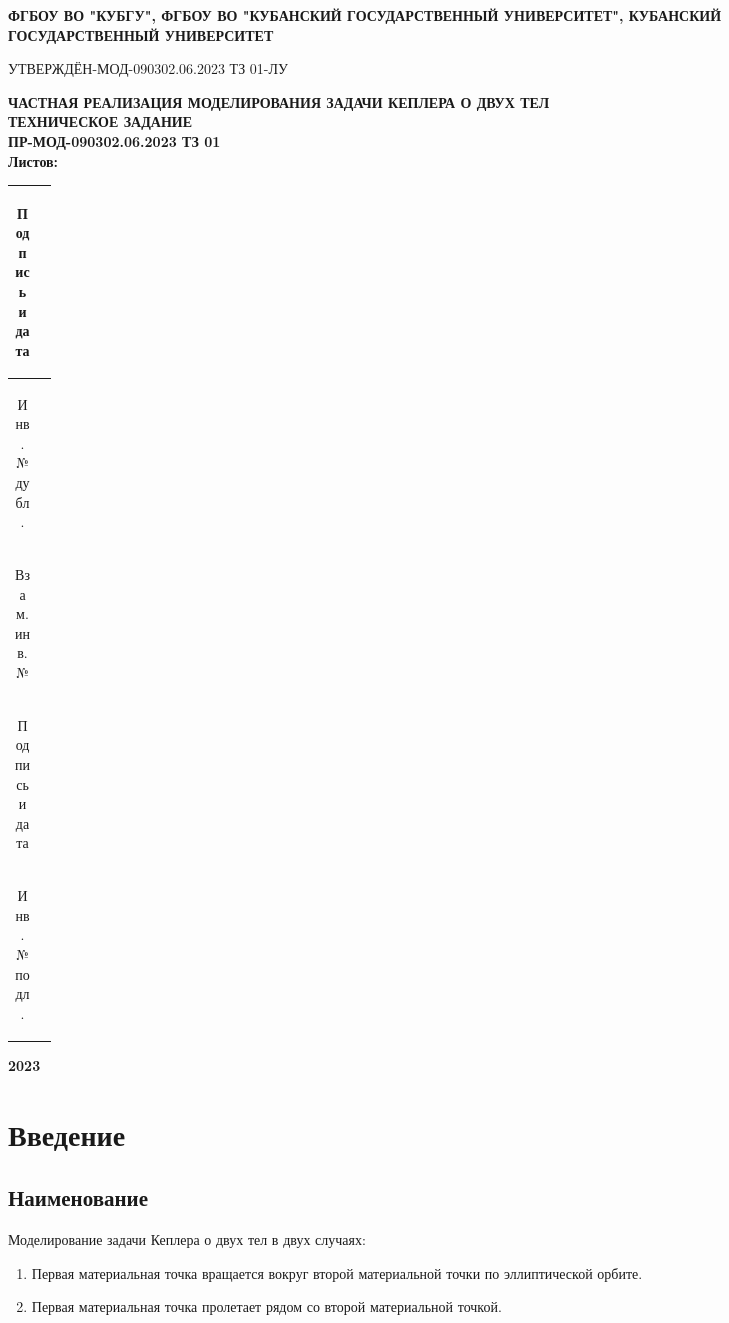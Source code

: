 


\thispagestyle{empty}
 \begin{center}
 \large{\textbf{ФГБОУ ВО "КУБГУ", ФГБОУ ВО "КУБАНСКИЙ ГОСУДАРСТВЕННЫЙ УНИВЕРСИТЕТ", КУБАНСКИЙ ГОСУДАРСТВЕННЫЙ УНИВЕРСИТЕТ}}\\[3ex]
 \end{center}
 УТВЕРЖДЁН-МОД-090302.06.2023 ТЗ 01-ЛУ\newline
 \begin{center}
  \large{\textbf{ЧАСТНАЯ РЕАЛИЗАЦИЯ МОДЕЛИРОВАНИЯ ЗАДАЧИ КЕПЛЕРА О ДВУХ ТЕЛ}}
  \\[3ex]
  \large{\textbf{ТЕХНИЧЕСКОЕ ЗАДАНИЕ\\ПР-МОД-090302.06.2023 ТЗ 01\\Листов: \pageref{lastpage}}}
 \end{center}
 \begin{table}[!h]
  \begin{tabular}{|c|p{0.05\linewidth}|} \hline
   \begin{sideways}Подпись и дата\end{sideways} & \\ \hline
   \begin{sideways}Инв.№ дубл.\end{sideways} & \\ \hline
   \begin{sideways}Взам.инв.№\end{sideways} & \\ \hline
   \begin{sideways}Подпись и дата\end{sideways} & \\ \hline
   \begin{sideways}Инв.№подл.\end{sideways} & \\ \hline
  \end{tabular}
 \end{table}
 \hfill \break
 \begin{center}
  \large{\textbf{2023}}
 \end{center}

 \newpage
 \tableofcontents\newpage
 \section{Введение}
 \subsection{Наименование}
 Моделирование задачи Кеплера о двух тел в двух случаях:
 \begin{enumerate}
  \item Первая материальная точка вращается вокруг второй материальной точки по эллиптической орбите.
  \item Первая материальная точка пролетает рядом со второй материальной точкой.
 \end{enumerate}
